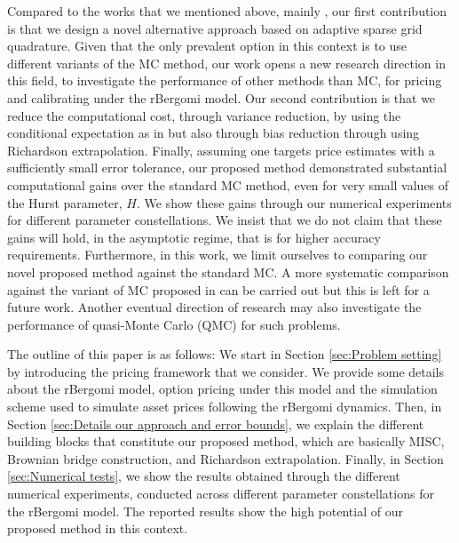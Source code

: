 Compared to the works that we mentioned above, mainly \cite{mccrickerd2017turbocharging}, our first contribution is that we design a novel alternative approach based on adaptive sparse grid quadrature. Given that the only prevalent option in this context is to use different variants of the MC method, our work opens a new  research direction in this field, to investigate the performance of other methods than MC, for pricing and calibrating under the rBergomi model. Our second contribution is that we reduce the computational cost, through variance reduction,  by using the conditional expectation as in \cite{mccrickerd2017turbocharging} but also through bias reduction through using Richardson extrapolation. Finally, assuming one targets price estimates with a sufficiently small  error tolerance, our proposed method demonstrated substantial computational gains  over the standard MC method, even for very small values of the Hurst parameter, $H$. We show  these gains through our numerical experiments for  different parameter constellations. We insist that we do not claim that these gains will hold, in the asymptotic regime, that is for higher accuracy requirements. Furthermore,  in this work, we limit ourselves to comparing our novel proposed method against the standard MC. A more systematic comparison against the variant of MC proposed in \cite{mccrickerd2017turbocharging}  can be carried out but this is left for a future work. Another eventual direction of research may also investigate the performance of quasi-Monte Carlo (QMC) for such problems.


The outline of this paper is as follows: We start in Section \ref{sec:Problem setting} by  introducing  the pricing framework that we consider. We provide some details about the rBergomi model, option pricing under this model and the simulation scheme used to simulate asset prices following the rBergomi dynamics. Then, in Section \ref{sec:Details our approach and error bounds}, we explain the different building blocks that constitute our proposed method, which are basically MISC, Brownian bridge construction, and Richardson extrapolation. Finally, in Section \ref{sec:Numerical tests}, we show the results obtained through the different numerical experiments, conducted across different parameter constellations for the rBergomi model. The reported results show the high potential of our proposed method in this context.


